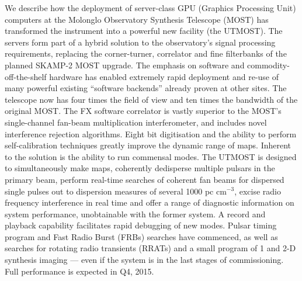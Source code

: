 We describe how the deployment of server-class GPU (Graphics Processing Unit) computers at the Molonglo Observatory Synthesis Telescope (MOST) has transformed the instrument into a powerful new facility (the UTMOST). The servers form part of a hybrid solution to the observatory's signal processing requirements, replacing the corner-turner, correlator and fine filterbanks of the planned SKAMP-2 MOST upgrade. The emphasis on software and commodity-off-the-shelf hardware has enabled extremely rapid deployment and re-use of many powerful existing ``software backends'' already proven at other sites. The telescope now has four times the field of view and ten times the bandwidth of the original MOST. The FX software correlator is vastly superior to the MOST's single-channel fan-beam multiplication interferometer, and includes novel interference rejection algorithms. Eight bit digitisation and the ability to perform self-calibration techniques greatly improve the dynamic range of maps. Inherent to the solution is the ability to run commensal modes. The UTMOST is designed to simultaneously make maps, coherently dedisperse multiple pulsars in the primary beam, perform real-time searches of coherent fan beams for dispersed single pulses out to dispersion measures of several 1000 pc cm$^{-3}$, excise radio frequency interference in real time and offer a range of diagnostic information on system performance, unobtainable with the former system. A record and playback capability facilitates rapid debugging of new modes. Pulsar timing program and Fast Radio Burst (FRBs) searches have commenced, as well as searches for rotating radio transients (RRATs) and a small program of 1 and 2-D synthesis imaging --- even if the system is in the last stages of commissioning. Full performance is expected in Q4, 2015.   
    
    